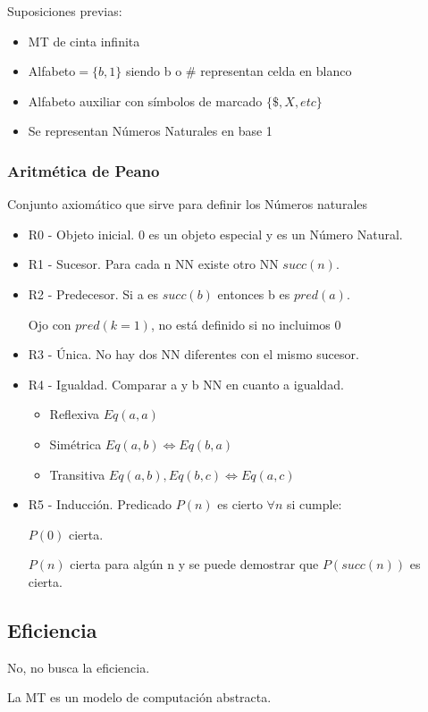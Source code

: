 Suposiciones previas:
\begin{itemize}
	\item MT de cinta infinita
	\item Alfabeto$=\{b,1\}$ siendo b o $\#$ representan celda en blanco
	\item Alfabeto auxiliar con símbolos de marcado $\{\$, X, etc\}$
	\item Se representan Números Naturales en base 1
\end{itemize}

\subsubsection{Aritmética de Peano}
Conjunto axiomático que sirve para definir los Números naturales
\begin{itemize}
	\item R0 - Objeto inicial. 0 es un objeto especial y es un Número Natural.
	\item R1 - Sucesor. Para cada n NN existe otro NN $succ(n)$.
	\item R2 - Predecesor. Si a es $succ(b)$ entonces b es $pred(a)$.

	      Ojo con $pred(k=1)$, no está definido si no incluimos 0
	\item R3 - Única. No hay dos NN diferentes con el mismo sucesor.
	\item R4 - Igualdad. Comparar a y b NN en cuanto a igualdad.
	      \begin{itemize}
		      \item Reflexiva $Eq(a,a)$
		      \item Simétrica $Eq(a,b) \Leftrightarrow Eq(b,a)$
		      \item Transitiva $Eq(a,b), Eq(b,c) \Leftrightarrow Eq(a,c)$
	      \end{itemize}
	\item R5 - Inducción. Predicado $P(n)$ es cierto $\forall n$ si cumple:

	      $P(0)$ cierta.

	      $P(n)$ cierta para algún n y se puede demostrar que $P(succ(n))$ es cierta.
\end{itemize}

\subsection{Eficiencia}
No, no busca la eficiencia.

La MT es un modelo de computación abstracta.

